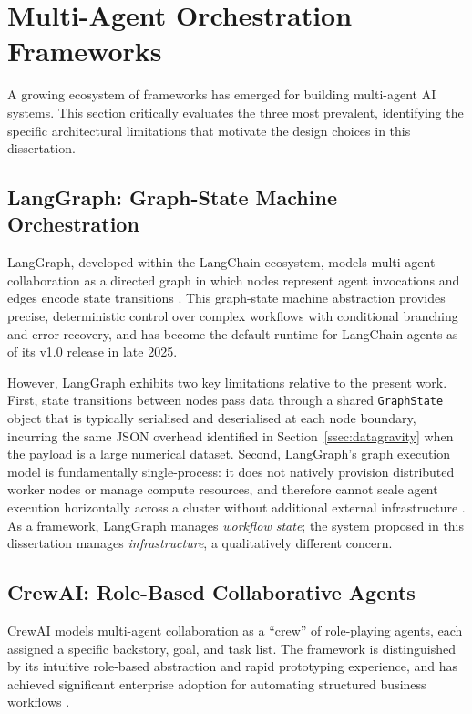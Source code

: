 \documentclass[12pt, a4paper]{report}
\begin{document}
\section{Multi-Agent Orchestration Frameworks}
\label{sec:mas_frameworks}

A growing ecosystem of frameworks has emerged for building multi-agent AI systems.
This section critically evaluates the three most prevalent, identifying the specific
architectural limitations that motivate the design choices in this dissertation.

\subsection{LangGraph: Graph-State Machine Orchestration}
\label{ssec:langgraph}

LangGraph, developed within the LangChain ecosystem, models multi-agent collaboration
as a directed graph in which nodes represent agent invocations and edges encode state
transitions \citep{langgraph2024}.
This graph-state machine abstraction provides precise, deterministic control over
complex workflows with conditional branching and error recovery, and has become the
default runtime for LangChain agents as of its v1.0 release in late 2025.

However, LangGraph exhibits two key limitations relative to the present work.
First, state transitions between nodes pass data through a shared \texttt{GraphState}
object that is typically serialised and deserialised at each node boundary, incurring the
same JSON overhead identified in Section~\ref{ssec:datagravity} when the payload is a
large numerical dataset.
Second, LangGraph's graph execution model is fundamentally single-process: it does not
natively provision distributed worker nodes or manage compute resources, and therefore
cannot scale agent execution horizontally across a cluster without additional external
infrastructure \citep{agentframeworks2025empirical}.
As a framework, LangGraph manages \emph{workflow state}; the system proposed in this
dissertation manages \emph{infrastructure}, a qualitatively different concern.

\subsection{CrewAI: Role-Based Collaborative Agents}
\label{ssec:crewai}

CrewAI models multi-agent collaboration as a ``crew'' of role-playing agents, each
assigned a specific backstory, goal, and task list.
The framework is distinguished by its intuitive role-based abstraction and rapid
prototyping experience, and has achieved significant enterprise adoption for automating
structured business workflows \citep{crewai2024,Bornstein2023}.
\end{document}
